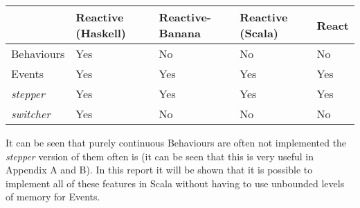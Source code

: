   \begin{center}
     \begin{tabular}{ | l | l | l | l | l | }
       \hline
        & Reactive (Haskell) & Reactive-Banana & Reactive (Scala) & React \\ \hline \hline
       Behaviours & Yes & No & No & No \\ \hline
       Events & Yes & Yes & Yes & Yes \\ \hline
       \emph{stepper} & Yes & Yes & Yes & Yes \\ \hline
       \emph{switcher} & Yes & No & No & No \\ \hline  
       \hline
     \end{tabular}
   \end{center}
   
   It can be seen that purely continuous Behaviours are often not implemented the \emph{stepper} version
   of them often is (it can be seen that this is very useful in Appendix A and B). In this report it will
   be shown that it is possible to implement all of these features in Scala without having to use unbounded levels
   of memory for Events. 